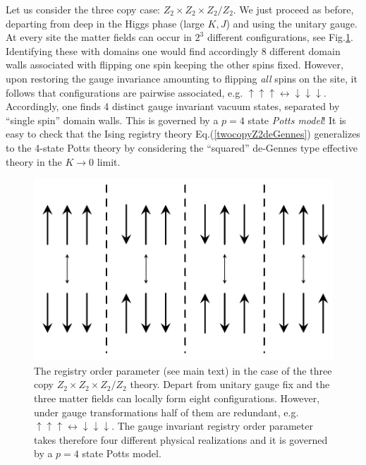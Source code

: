 Let us consider the three copy case:  $Z_2 \times Z_2 \times Z_2/ Z_2$. We just proceed as before, departing from deep in the Higgs phase (large $K,J$) and using the unitary gauge. At every site the matter fields can occur in $2^3$ different configurations, see  Fig.\ref{threecopyexample}. Identifying these with domains one would find accordingly 8 different domain walls associated with flipping one spin keeping the other spins fixed. However, upon restoring the gauge invariance amounting to flipping {\em all} spins on the site, it follows that configurations are pairwise associated, e.g.  $\uparrow \uparrow \uparrow \leftrightarrow  \downarrow \downarrow \downarrow$. Accordingly, one finds 4 distinct gauge invariant vacuum states, separated by ``single spin'' domain walls. This is governed by a $p = 4$ state {\em Potts model}! It is easy to check that the Ising registry theory Eq.(\ref{twocopyZ2deGennes}) generalizes to the 4-state Potts theory  by considering the ``squared'' de-Gennes type effective theory in the $K \rightarrow 0$ limit. 

\begin{figure}[!h]
	\centering
	\includegraphics[scale=.4]{figures/chapter2/Z2xZ2xZ2Z2domainWall.pdf}
	\caption{The registry order parameter (see main text) in the case of the three copy $Z_2 \times Z_2 \times Z_2/Z_2$ theory. Depart from unitary gauge fix and the three matter fields can locally form eight configurations. However, under gauge transformations half of them are redundant, e.g. $\uparrow \uparrow \uparrow \leftrightarrow \downarrow \downarrow \downarrow$. The gauge invariant registry order parameter takes therefore four different physical realizations and it is governed by a $p=4$ state Potts model.}
	\label{threecopyexample}
\end{figure} 


